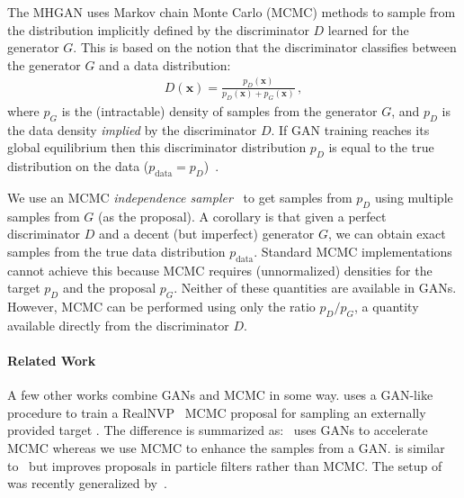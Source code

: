 \documentclass{article}
\renewcommand{\vec}[1]{{\boldsymbol{\mathbf{#1}}}} %
\newcommand{\target}{{p^\star}}
\newcommand{\PG}{{p_G}}
\newcommand{\PD}{{p_D}}
\newcommand{\PR}{{p_{\textrm{data}}}}
\begin{document}
The MHGAN uses Markov chain Monte Carlo (MCMC) methods to sample from the distribution implicitly defined by the discriminator $D$ learned for the generator $G$.
This is based on the notion that the discriminator classifies between the generator $G$ and a data distribution:
\begin{align}
  D(\vec x) = \frac{\PD(\vec x)}{\PD(\vec x) + \PG(\vec x)}\,, \label{eq:define PD}
\end{align}
where $\PG$ is the (intractable) density of samples from the generator $G$, and $\PD$ is the data density \emph{implied} by the discriminator $D$.
If GAN training reaches its global equilibrium then this discriminator distribution $\PD$ is equal to the true distribution on the data ($\PR = \PD$)~\citep{Goodfellow2014}.

We use an MCMC \emph{independence sampler}~\citep{Tierney1994} to get samples from $\PD$ using multiple samples from $G$ (as the proposal)\@.
A corollary is that given a perfect discriminator $D$ and a decent (but imperfect) generator $G$, we can obtain exact samples from the true data distribution $\PR$.
Standard MCMC implementations cannot achieve this because MCMC requires (unnormalized) densities for the target $\PD$ and the proposal $\PG$.
Neither of these quantities are available in GANs.
However, MCMC can be performed using only the ratio $\PD / \PG$, a quantity available directly from the discriminator $D$.

\paragraph{Related Work}
A few other works combine GANs and MCMC in some way.
\citet{Song2017} uses a GAN-like procedure to train a RealNVP~\citep{Dinh2016} MCMC proposal for sampling an externally provided target \smash{$\target$}.
The difference is summarized as:~\citet{Song2017} uses GANs to accelerate MCMC whereas we use MCMC to enhance the samples from a GAN\@.
\citet{Kempinska2017} is similar to~\citet{Song2017} but improves proposals in particle filters rather than MCMC\@.
The setup of~\citet{Song2017} was recently generalized by~\citet{Neklyudov2018}.
\end{document}
